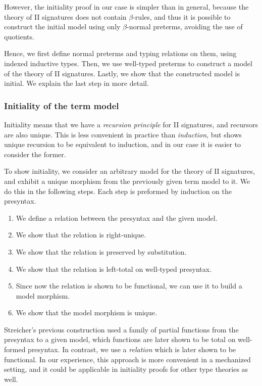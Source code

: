 However, the initiality proof in our case is simpler than in general, because
the theory of II signatures does not contain $\beta$-rules, and thus it is
possible to construct the initial model using only $\beta$-normal preterms,
avoiding the use of quotients.

Hence, we first define normal preterms and typing relations on them, using indexed
inductive types. Then, we use well-typed preterms to construct a model of the theory
of II signatures. Lastly, we show that the constructed model is initial. We explain
the last step in more detail.

\subsubsection*{Initiality of the term model}

Initiality means that we have a \emph{recursion principle} for II signatures,
and recursors are also unique. This is less convenient in practice than
\emph{induction}, but \cite{qiit} shows unique recursion to be equivalent to
induction, and in our case it is easier to consider the former.

To show initiality, we consider an arbitrary model for the theory of II
signatures, and exhibit a unique morphism from the previously given term model
to it. We do this in the following steps. Each step is preformed by induction on
the presyntax.

\begin{enumerate}
  \item We define a relation between the presyntax and the given model.
  \item We show that the relation is right-unique.
  \item We show that the relation is preserved by substitution.
  \item We show that the relation is left-total on well-typed presyntax.
  \item Since now the relation is shown to be functional, we can use it to
        build a model morphism.
  \item We show that the model morphism is unique.
\end{enumerate}

Streicher's previous construction \cite{streicher2012semantics} used a family of
partial functions from the presyntax to a given model, which functions are later
shown to be total on well-formed presyntax. In contrast, we use a
\emph{relation} which is later shown to be functional. In our experience, this
approach is more convenient in a mechanized setting, and it could be applicable
in initiality proofs for other type theories as well.

